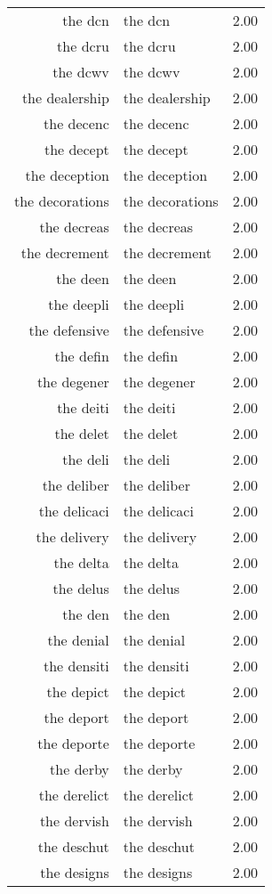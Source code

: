 \begin{table}[ht]
\begin{tabular}{rlr}
  the dcn & the dcn & 2.00 \\ 
  the dcru & the dcru & 2.00 \\ 
  the dcwv & the dcwv & 2.00 \\ 
  the dealership & the dealership & 2.00 \\ 
  the decenc & the decenc & 2.00 \\ 
  the decept & the decept & 2.00 \\ 
  the deception & the deception & 2.00 \\ 
  the decorations & the decorations & 2.00 \\ 
  the decreas & the decreas & 2.00 \\ 
  the decrement & the decrement & 2.00 \\ 
  the deen & the deen & 2.00 \\ 
  the deepli & the deepli & 2.00 \\ 
  the defensive & the defensive & 2.00 \\ 
  the defin & the defin & 2.00 \\ 
  the degener & the degener & 2.00 \\ 
  the deiti & the deiti & 2.00 \\ 
  the delet & the delet & 2.00 \\ 
  the deli & the deli & 2.00 \\ 
  the deliber & the deliber & 2.00 \\ 
  the delicaci & the delicaci & 2.00 \\ 
  the delivery & the delivery & 2.00 \\ 
  the delta & the delta & 2.00 \\ 
  the delus & the delus & 2.00 \\ 
  the den & the den & 2.00 \\ 
  the denial & the denial & 2.00 \\ 
  the densiti & the densiti & 2.00 \\ 
  the depict & the depict & 2.00 \\ 
  the deport & the deport & 2.00 \\ 
  the deporte & the deporte & 2.00 \\ 
  the derby & the derby & 2.00 \\ 
  the derelict & the derelict & 2.00 \\ 
  the dervish & the dervish & 2.00 \\ 
  the deschut & the deschut & 2.00 \\ 
  the designs & the designs & 2.00 \\ 

\end{tabular}
\end{table}
